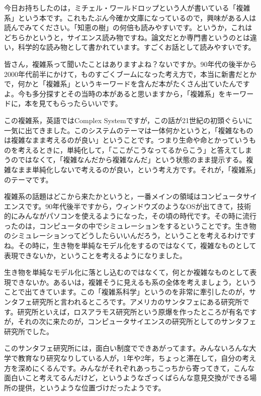 \documentclass{ltjsbook}
\begin{document}
今日お持ちしたのは，ミチェル・ワールドロップという人が書いている「複雑系」という本です\parencite{Waldrop}。これもたぶん今確か文庫になっているので，興味がある人は読んでみてください。「知恵の樹」\parencite{Chienoki}の何倍も読みやすいです。というか，これはどちらかというと，サイエンス読み物ですね。論文だとか専門書というのとは違い，科学的な読み物として書かれています。すごくお話として読みやすいです。

皆さん，複雑系って聞いたことはありますよね？ないですか。90年代の後半から2000年代前半にかけて，ものすごくブームになった考え方で，本当に新書だとかで，何かと「複雑系」というキーワードを含んだ本がたくさん出ていたんですよ。今も多分探すとその当時の本があると思いますから，「複雑系」をキーワードに，本を見てもらったらいいです。

この複雑系，英語ではComplex Systemですが，この話が21世紀の初頭ぐらいに一気に出てきました。このシステムのテーマは一体何かというと，「複雑なものは複雑なまま考えるのが良い」ということです。つまり生命や命とかっていうものを考えるときに，単純化して，「ここがこうなってるからこう」と答えてしまうのではなくて，「複雑なんだから複雑なんだ」という状態のまま提示する。複雑なまま単純化しないで考えるのが良い，という考え方です。それが，「複雑系」のテーマです。

複雑系の話題はどこから来たかというと，一番メインの領域はコンピュータサイエンスです。90年代後半ですから，ウィンドウズのようなOSが出てきて，技術的にみんながパソコンを使えるようになった，その頃の時代です。その時に流行ったのは，コンピュータの中でシミュレーションをするということです。生き物のシミュレーションってどうしたらいいんだろう，ということを考えるわけですね。その時に，生き物を単純なモデル化をするのではなくて，複雑なものとして表現できないか，ということを考えるようになりました。

生き物を単純なモデル化に落とし込むのではなくて，何とか複雑なものとして表現できないか。あるいは，複雑そうに見えるも系の全体を考えましょう，ということで出てきています。この「複雑系科学」というのを非常に牽引したのが，サンタフェ研究所と言われるところです。アメリカのサンタフェにある研究所です。研究所といえば，ロスアラモス研究所という原爆を作ったところが有名ですが，それの次に来たのが，コンピュータサイエンスの研究所としてのサンタフェ研究所でした。

このサンタフェ研究所には，面白い制度でできあがってます。みんないろんな大学で教育なり研究なりしている人が，1年や2年，ちょっと滞在して，自分の考え方を深めにくるんです。みんながそれぞれあっちこっちから寄ってきて，こんな面白いこと考えてるんだけど，というようなざっくばらんな意見交換ができる場所の提供，というような位置づけだったようです。
\end{document}
